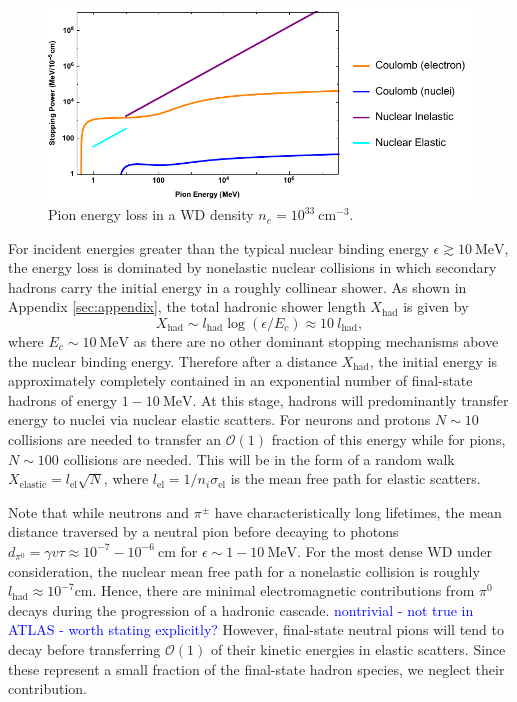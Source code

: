 \documentclass[twocolumn,showpacs,preprintnumbers,amsmath,amssymb,prd]{revtex4}
\newcommand{\OO}{\mathcal{O}}
\begin{document}
\begin{figure}
\label{fig:SPpion}
\includegraphics[scale=.45]{SPpion.pdf}
\caption{Pion energy loss in a WD density $n_e = 10^{33} ~\text{cm}^{-3}$.}
\end{figure}

For incident energies greater than the typical nuclear binding energy $\epsilon \gtrsim 10 ~\text{MeV}$, the energy loss is dominated by nonelastic nuclear collisions in which secondary hadrons carry the initial energy in a roughly collinear shower. As shown in Appendix \ref{sec:appendix}, the total hadronic shower length $X_{\text{had}}$ is given by
\begin{equation}
\label{eq:hadlength}
X_{\text{had}} \sim l_\text{had} \log{(\epsilon/E_c)} \approx 10 ~l_\text{had},
\end{equation}
where $E_c \sim 10 ~\text{MeV}$ as there are no other dominant stopping mechanisms above the nuclear binding energy. Therefore after a distance $X_\text{had}$, the initial energy is approximately completely contained in an exponential number of final-state hadrons of energy $1 - 10 ~\text{MeV}$. At this stage, hadrons will predominantly transfer energy to nuclei via nuclear elastic scatters. For neurons and protons $N \sim 10$ collisions are needed to transfer an $\OO(1)$ fraction of this energy while for pions, $N \sim 100$ collisions are needed. This will be in the form of a random walk $X_\text{elastic} = l_\text{el} \sqrt{N}$, where $ l_\text{el} = 1/n_i \sigma_\text{el}$ is the mean free path for elastic scatters.

Note that while neutrons and $\pi^\pm$ have characteristically long lifetimes, the mean distance traversed by a neutral pion before decaying to photons $d_{\pi^0} = \gamma v \tau \approx 10^{-7} - 10^{-6} ~\text{cm}$ for $\epsilon \sim 1 - 10 ~\text{MeV}$. For the most dense WD under consideration, the nuclear mean free path for a nonelastic collision is roughly $l_\text{had} \approx 10^{-7} \text{cm}$. Hence, there are minimal electromagnetic contributions from $\pi^0$ decays during the progression of a hadronic cascade. \textcolor{blue}{nontrivial - not true in ATLAS - worth stating explicitly?} However, final-state neutral pions will tend to decay before transferring $\OO(1)$ of their kinetic energies in elastic scatters. Since these represent a small fraction of the final-state hadron species, we neglect their contribution.
\end{document}
